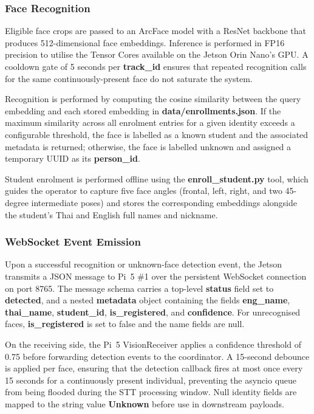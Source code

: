 \subsubsection{Face Recognition}

Eligible face crops are passed to an ArcFace model with a ResNet backbone that produces 512-dimensional face embeddings. Inference is performed in FP16 precision to utilise the Tensor Cores available on the Jetson Orin Nano's GPU. A cooldown gate of 5 seconds per \textbf{track\_id} ensures that repeated recognition calls for the same continuously-present face do not saturate the system.

Recognition is performed by computing the cosine similarity between the query embedding and each stored embedding in \textbf{data/enrollments.json}. If the maximum similarity across all enrolment entries for a given identity exceeds a configurable threshold, the face is labelled as a known student and the associated metadata is returned; otherwise, the face is labelled unknown and assigned a temporary UUID as its \textbf{person\_id}.

Student enrolment is performed offline using the \textbf{enroll\_student.py} tool, which guides the operator to capture five face angles (frontal, left, right, and two 45-degree intermediate poses) and stores the corresponding embeddings alongside the student's Thai and English full names and nickname.

\subsubsection{WebSocket Event Emission}

Upon a successful recognition or unknown-face detection event, the Jetson transmits a JSON message to Pi~5 \#1 over the persistent WebSocket connection on port 8765. The message schema carries a top-level \textbf{status} field set to \textbf{detected}, and a nested \textbf{metadata} object containing the fields \textbf{eng\_name}, \textbf{thai\_name}, \textbf{student\_id}, \textbf{is\_registered}, and \textbf{confidence}. For unrecognised faces, \textbf{is\_registered} is set to false and the name fields are null.

On the receiving side, the Pi~5 VisionReceiver applies a confidence threshold of 0.75 before forwarding detection events to the coordinator. A 15-second debounce is applied per face, ensuring that the detection callback fires at most once every 15 seconds for a continuously present individual, preventing the asyncio queue from being flooded during the STT processing window. Null identity fields are mapped to the string value \textbf{Unknown} before use in downstream payloads.

